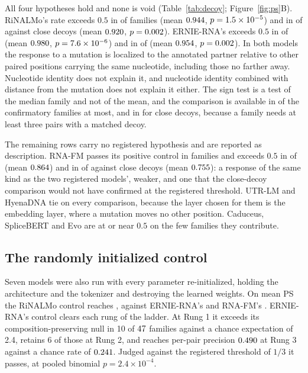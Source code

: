 \documentclass[11pt]{article}
\begin{document}
All four hypotheses hold and none is void (Table~\ref{tab:decoy}; Figure~\ref{fig:ps}B). RiNALMo's
rate exceeds $0.5$ in \decoyAllAboveRiNALMo{} of \decoyAllFamiliesRiNALMo{}
families (mean $0.944{}$, $p = 1.5 \times 10^{-5}{}$) and in
\decoyCloseAboveRiNALMo{} of \decoyCloseFamiliesRiNALMo{} against close decoys
(mean $0.920{}$, $p = 0.002{}$). ERNIE-RNA's
exceeds $0.5$ in \decoyAllAboveErnieRNA{} of \decoyAllFamiliesErnieRNA{}
(mean $0.980{}$, $p = 7.6 \times 10^{-6}{}$) and in
\decoyCloseAboveErnieRNA{} of \decoyCloseFamiliesErnieRNA{}
(mean $0.954{}$, $p = 0.002{}$). In both
models the response to a mutation is localized to the annotated partner
relative to other paired positions carrying the same nucleotide, including
those no farther away. Nucleotide identity does not explain it, and nucleotide
identity combined with distance from the mutation does not explain it either.
The sign test is a test of the median family and not of the mean, and the
comparison is available in \decoyAllFamiliesErnieRNA{} of the \confirmatoryN{}
confirmatory families at most, and in \decoyCloseFamiliesErnieRNA{} for close
decoys, because a family needs at least three pairs with a matched decoy.

The remaining rows carry no registered hypothesis and are reported as
description. RNA-FM passes its positive control in
\decoyPopulationRNAFM{} families and exceeds $0.5$ in \decoyAllAboveRNAFM{} of
\decoyAllFamiliesRNAFM{} (mean $0.864{}$) and in
\decoyCloseAboveRNAFM{} of \decoyCloseFamiliesRNAFM{} against close decoys
(mean $0.755{}$): a response of the same kind as the two
registered models', weaker, and one that the close-decoy comparison would not
have confirmed at the registered threshold. UTR-LM and HyenaDNA tie on every
comparison, because the layer chosen for them is the embedding layer, where a
mutation moves no other position. Caduceus, SpliceBERT and Evo are at or near
$0.5$ on the few families they contribute.

\subsection{The randomly initialized control}
\label{sec:random-init}

Seven models were also run with every parameter re-initialized, holding the
architecture and the tokenizer and destroying the learned weights. On mean PS
the RiNALMo control reaches \psUntrainedRiNALMo{}, against ERNIE-RNA's
\psUntrainedErnieRNA{} and RNA-FM's \psUntrainedRNAFM{}. ERNIE-RNA's
control clears each rung of the ladder. At Rung 1 it exceeds its
composition-preserving null in 10 of $47{}$ families against a chance
expectation of 2.4, retains 6 of those at Rung 2, and reaches per-pair precision
$0.490{}$ at Rung 3 against a chance rate of
$0.241{}$. Judged against the
registered threshold of $1/3$ it passes, at pooled binomial $p = 2.4 \times
10^{-4}$.
\end{document}
